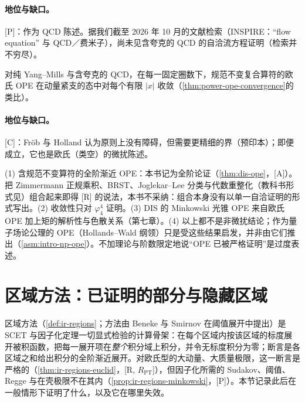 \paragraph{地位与缺口。}[P]：作为 QCD 陈述。据我们截至 2026 年 10 月的文献检索（INSPIRE：“flow equation” 与 QCD／费米子），尚未见含夸克的 QCD 的自洽流方程证明（检索并不穷尽）。

\begin{conjecture}\label{conj:front-ope-convergence}
对纯 Yang--Mills 与含夸克的 QCD，在每一固定圈数下，规范不变复合算符的欧氏 OPE 在动量紧支的态中对每个有限 $|x|$ 收敛（\cref{thm:power-ope-convergence}的类比）。
\end{conjecture}

\paragraph{地位与缺口。}[C]：Fröb 与 Holland 认为原则上没有障碍，但需要更精细的界\cite{Frob:2016mzv}（预印本）；即便成立，它也是欧氏（类空）的微扰陈述。

\begin{remark}\label{rem:front-ope-qcd-status}
(1) 含规范不变算符的全阶渐近 OPE：本书记为全阶论证（\cref{thm:dis-ope}，[A]）。把 Zimmermann 正规乘积\cite{Zimmermann1973}、BRST、Joglekar--Lee 分类\cite{Joglekar:1975nu}与代数重整化\cite{Piguet:1995er}（教科书形式见\cite{Collins1984}）组合起来即得 [R] 的说法，本书不采纳：组合本身没有以单一自洽证明的形式写出。(2) 收敛性只对 $\varphi^4_4$ 证明。(3) DIS 的 Minkowski 光锥 OPE 来自欧氏 OPE 加上矩的解析性与色散关系（第七章）。(4) 以上都不是非微扰结论；作为量子场论公理的 OPE（Hollands--Wald 纲领）只是受这些结果启发，并非由它们推出（\cref{asm:intro-np-ope}）。不加理论与阶数限定地说“OPE 已被严格证明”是过度表述。
\end{remark}

\section{区域方法：已证明的部分与隐藏区域}\label{sec:front-regions}

区域方法（\cref{def:ir-regions}；方法由 Beneke 与 Smirnov 在阈值展开中提出\cite{BenekeSmirnov1998}）是 SCET 与因子化定理一切显式检验的计算骨架：在每个区域内按该区域的标度展开被积函数，把每一展开项在\emph{整个}积分域上积分，并令无标度积分为零；断言是各区域之和给出积分的全阶渐近展开。对欧氏型的大动量、大质量极限，这一断言是严格的（\cref{thm:ir-regions-euclid}，[R, $R_{\mathrm{PT}}$]\cite{Smirnov:1990rz,Smirnov2002}），但因子化所需的 Sudakov、阈值、Regge 与在壳极限不在其内（\cref{prop:ir-regions-minkowski}，[P]）。本节记录此后在一般情形下证明了什么，以及它在哪里失效。


